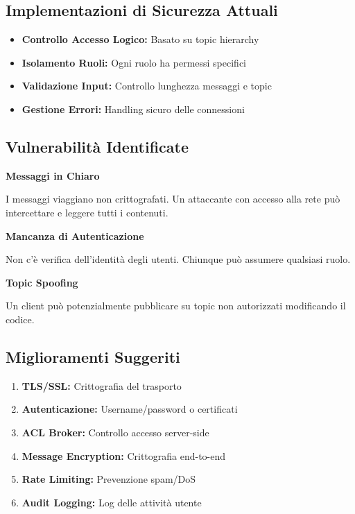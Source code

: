 \documentclass[12pt,a4paper]{article}
\begin{document}
\subsection{Implementazioni di Sicurezza Attuali}
\begin{itemize}
    \item \textbf{Controllo Accesso Logico:} Basato su topic hierarchy
    \item \textbf{Isolamento Ruoli:} Ogni ruolo ha permessi specifici
    \item \textbf{Validazione Input:} Controllo lunghezza messaggi e topic
    \item \textbf{Gestione Errori:} Handling sicuro delle connessioni
\end{itemize}

\subsection{Vulnerabilità Identificate}

\begin{warningbox}
\textbf{Messaggi in Chiaro}

I messaggi viaggiano non crittografati. Un attaccante con accesso alla rete può intercettare e leggere tutti i contenuti.

\textbf{Mancanza di Autenticazione}

Non c'è verifica dell'identità degli utenti. Chiunque può assumere qualsiasi ruolo.

\textbf{Topic Spoofing}

Un client può potenzialmente pubblicare su topic non autorizzati modificando il codice.
\end{warningbox}

\subsection{Miglioramenti Suggeriti}
\begin{enumerate}
    \item \textbf{TLS/SSL:} Crittografia del trasporto
    \item \textbf{Autenticazione:} Username/password o certificati
    \item \textbf{ACL Broker:} Controllo accesso server-side
    \item \textbf{Message Encryption:} Crittografia end-to-end
    \item \textbf{Rate Limiting:} Prevenzione spam/DoS
    \item \textbf{Audit Logging:} Log delle attività utente
\end{enumerate}
\end{document}
